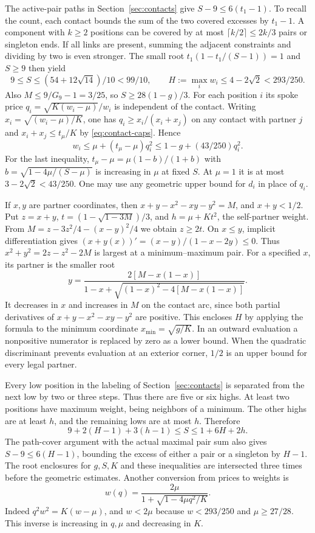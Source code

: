 \documentclass[11pt,a4paper]{article}
\theoremstyle{definition}
\begin{document}
The active-pair paths in Section~\ref{sec:contacts} give
$S-9\le6(t_1-1)$. To recall the count, each contact bounds the
sum of the two covered excesses by $t_1-1$. A component with $k\ge2$
positions can be covered by at most $\lceil k/2\rceil\le2k/3$ pairs
or singleton ends. If all links are present, summing the adjacent
constraints and dividing by two is even stronger.
The small root $t_1(1-t_1/(S-1))=1$ and $S\ge9$ then yield
\[
 9\le S\le(54+12\sqrt{14})/10<99/10,\qquad
 H:=\max_iw_i\le4-2\sqrt2<293/250.
\]
Also $M\le9/G_9-1=3/25$, so $S\ge28(1-g)/3$.
For each position $i$ its spoke price
$q_i=\sqrt{K(w_i-\mu)}/w_i$ is independent of the contact.
Writing $x_i=\sqrt{(w_i-\mu)/K}$, one has
$q_i\ge x_i/(x_i+x_j)$ on any contact with partner $j$ and
$x_i+x_j\le t_\mu/K$ by \eqref{eq:contact-caps}. Hence
\begin{equation}
 w_i\le\mu+(t_\mu-\mu)q_i^2
       \le 1-g+(43/250)q_i^2 .
 \label{eq:wg9cap}
\end{equation}
For the last inequality,
$t_\mu-\mu=\mu(1-b)/(1+b)$ with
$b=\sqrt{1-4\mu/(S-\mu)}$ is increasing in $\mu$ at fixed $S$.
At $\mu=1$ it is at most $3-2\sqrt2<43/250$.
One may use any geometric upper bound for $d_i$ in place of $q_i$.

If $x,y$ are partner coordinates, then
$x+y-x^2-xy-y^2=M$, and $x+y<1/2$. Put
$z=x+y$, $t=(1-\sqrt{1-3M})/3$, and
$h=\mu+Kt^2$, the self-partner weight. From
$M=z-3z^2/4-(x-y)^2/4$ we obtain $z\ge2t$.
On $x\le y$, implicit differentiation gives
$(x+y(x))'=(x-y)/(1-x-2y)\le0$.
Thus $x^2+y^2=2z-z^2-2M$ is largest at a minimum--maximum
pair. For a specified $x$, its partner is the smaller root
\[
 y=\frac{2[M-x(1-x)]}
 {1-x+\sqrt{(1-x)^2-4[M-x(1-x)]}} .
\]
It decreases in $x$ and increases in $M$ on the contact arc, since
both partial derivatives of $x+y-x^2-xy-y^2$ are positive. This
encloses $H$ by applying the formula to the minimum coordinate
$x_{\min}=\sqrt{g/K}$. In an outward evaluation a nonpositive
numerator is replaced by zero as a lower bound. When the quadratic
discriminant prevents evaluation at an exterior corner, $1/2$ is an
upper bound for every legal partner.

Every low position in the labeling of Section~\ref{sec:contacts}
is separated from the next low by two or three steps. Thus there
are five or six highs. At least two positions have maximum weight,
being neighbors of a minimum. The other highs are at least $h$, and
the remaining lows are at most $h$. Therefore
\[
 9+2(H-1)+3(h-1)\le S\le 1+6H+2h .
\]
The path-cover argument with the actual maximal pair sum also gives
$S-9\le6(H-1)$, bounding the excess of either a pair or a singleton
by $H-1$. The root enclosures for $g,S,K$ and these inequalities
are intersected three times before the geometric estimates. Another
conversion from prices to weights is
\begin{equation}
 w(q)=\frac{2\mu}{1+\sqrt{1-4\mu q^2/K}} .
 \label{eq:wg9weight}
\end{equation}
Indeed $q^2w^2=K(w-\mu)$, and $w<2\mu$ because
$w<293/250$ and $\mu\ge27/28$. This inverse is increasing in
$q,\mu$ and decreasing in $K$.
\end{document}
